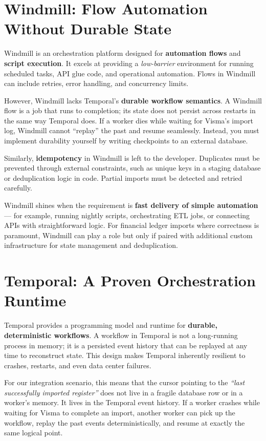 \documentclass[11pt, a4paper, twocolumn]{article} %
\begin{document}
\clearpage

\section*{Windmill: Flow Automation Without Durable State}

Windmill is an orchestration platform designed for \textbf{automation flows} and \textbf{script execution}. It excels at providing a \textit{low-barrier} environment for running scheduled tasks, API glue code, and operational automation. Flows in Windmill can include retries, error handling, and concurrency limits.

However, Windmill lacks Temporal’s \textbf{durable workflow semantics}. A Windmill flow is a job that runs to completion; its state does not persist across restarts in the same way Temporal does. If a worker dies while waiting for Visma’s import log, Windmill cannot ``replay'' the past and resume seamlessly. Instead, you must implement durability yourself by writing checkpoints to an external database.

Similarly, \textbf{idempotency} in Windmill is left to the developer. Duplicates must be prevented through external constraints, such as unique keys in a staging database or deduplication logic in code. Partial imports must be detected and retried carefully.

Windmill shines when the requirement is \textbf{fast delivery of simple automation} — for example, running nightly scripts, orchestrating ETL jobs, or connecting APIs with straightforward logic. For financial ledger imports where correctness is paramount, Windmill can play a role but only if paired with additional custom infrastructure for state management and deduplication.

\section*{Temporal: A Proven Orchestration Runtime}

Temporal provides a programming model and runtime for \textbf{durable, deterministic workflows}. A workflow in Temporal is not a long-running process in memory; it is a persisted event history that can be replayed at any time to reconstruct state. This design makes Temporal inherently resilient to crashes, restarts, and even data center failures.

For our integration scenario, this means that the cursor pointing to the \textit{``last successfully imported register''} does not live in a fragile database row or in a worker’s memory. It lives in the Temporal event history. If a worker crashes while waiting for Visma to complete an import, another worker can pick up the workflow, replay the past events deterministically, and resume at exactly the same logical point.
\end{document}
